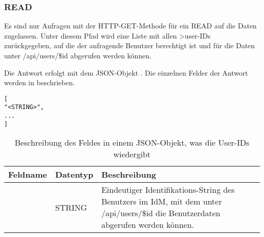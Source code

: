 \subsubsection{READ}
\label{sec:rest:api:user:read}
Es sind nur Anfragen mit der HTTP-GET-Methode für ein READ auf die Daten zugelassen.
Unter diesem Pfad wird eine Liste mit allen >user-IDs zurückgegeben, auf die der anfragende Benutzer berechtigt ist und für die Daten unter /api/users/\$id abgerufen werden können.

Die Antwort erfolgt mit dem JSON-Objekt . 
Die einzelnen Felder der Antwort werden in  beschrieben.

\begin{lstlisting}[caption={JSON-Antwort für einen GET-Aufruf des Pfads /api/users},label={lst:code:rest:api:user:read:ret},frame=tlrb]
[
"<STRING>",
...
]
\end{lstlisting}

\begin{longtable}{|p{}|p{}|p{}|}
		\caption{Beschreibung des Feldes in einem JSON-Objekt, was die User-IDs wiedergibt}
\endfoot
		\caption{Beschreibung des Feldes in einem JSON-Objekt, was die User-IDs wiedergibt}
		\label{tab:rest:api:schools:read:ret}
\endlastfoot 
\hline
			\textbf{Feldname} & \textbf{Datentyp} & \textbf{Beschreibung} \\ \hline
\endhead
 & STRING & Eindeutiger Identifikations-String des Benutzers im IdM, mit dem unter /api/users/\$id die Benutzerdaten abgerufen werden können.\\ \hline
\end{longtable}